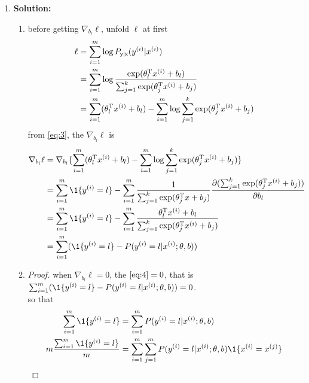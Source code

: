 \documentclass[a4paper]{article}
\begin{document}
{\begin{enumerate}
\item \textbf{Solution:}
\begin{enumerate}
\item before getting $\nabla_{b_l}\ell$, unfold $\ell$ at first
    \begin{equation}
    \begin{aligned}
        \ell &= \sum_{i=1}^m \log P_{\mathsf{y}|\mathsf{x}}(y^{(i)}|x^{(i)})  \\
        &= \sum_{i=1}^m \log \frac{\exp(\theta_l^{\mathrm{T}}x^{(i)}+b_l)}{
            \sum_{j=1}^k \exp(\theta_j^{\mathrm{T}}x^{(i)}+b_j)} \\
        &= \sum_{i=1}^m (\theta_l^{\mathrm{T}}x^{(i)}+b_l)-\sum_{i=1}^m \log\sum_{j=1}^k\exp(\theta_j^{\mathrm{T}}x^{(i)}+b_j)
    \end{aligned}
    \label{eq:3}
    \end{equation}
    from \eqref{eq:3}, the $\nabla_{b_l}\ell$ is
    \begin{equation}
    \begin{aligned}
        \nabla_{b_l}\ell &= \nabla_{b_l}\{\sum_{i=1}^m 
            (\theta_l^{\T}x^{(i)}+b_l)-\sum_{i=1}^m \log\sum_{j=1}^k\exp(\theta_j^{\T}x^{(i)}+b_j)\}\\
        &= \sum_{i=1}^m \1 \{ y^{(i)}=l \} - \sum_{i=1}^m \frac1{\sum_{j=1}^k\exp(\theta_j^{\T}x+b_j) }
        \frac{\partial (\sum_{j=1}^k \exp(\theta_j^{\T}x^{(i)}+b_j))}{\partial b_l} \\
        &= \sum_{i=1}^m \1 \{ y^{(i)}=l \} - \sum_{i=1}^m\frac{\theta_l^{\T}x^{(i)}+b_l}
        {\sum_{j=1}^k \exp(\theta_j^{\T}x^{(i)}+b_j)}\\
        &= \sum_{i=1}^m (\1 \{y^{(i)}=l\} - P(y^{(i)}=l|x^{(i)};\theta,b))
    \end{aligned}
    \label{eq:4}
    \end{equation}
    \item 
    \begin{proof}
        when $\nabla_{b_l}\ell=0$, the $\eqref{eq:4}=0$, that is 
            $\sum_{i=1}^m (\1 \{y^{(i)}=l\} - P(y^{(i)}=l|x^{(i)};\theta,b)) = 0$.\\
        so that
        \begin{equation*}
        \begin{aligned}
        \sum_{i=1}^m \1\{y^{(i)}=l\} &= \sum_{i=1}^m P(y^{(i)}=l|x^{(i)};\theta,b) \\
        m\frac{\sum_{i=1}^m \1\{y^{(i)}=l\}}{m} &= 
            \sum_{i=1}^m \sum_{j=1}^m P(y^{(i)}=l|x^{(i)};\theta,b) \1\{x^{(i)}=x^{(j)}\} \\

\end{aligned}
\end{equation*}
\end{proof}
\end{enumerate}
\end{enumerate}}
\end{document}
